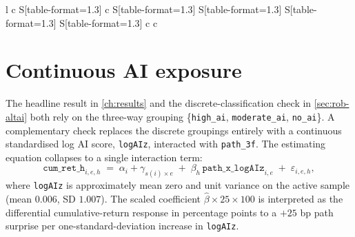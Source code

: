 \begin{table}[!htbp]
\begin{tabular}{l c S[table-format=1.3] c S[table-format=1.3] S[table-format=1.3] S[table-format=1.3] S[table-format=1.3] c c}
\bottomrule
\end{tabular}
\caption*{\footnotesize \textit{Notes.} Level critical values match those reported in the main-text GSADF tables (\cref{ch:results}) and are omitted for compactness; log critical values are recomputed under the log specification so that each verdict is evaluated against its own null. ``---'' indicates failure to reject at 90\,\%. Sample, lag order ($k=0$), control window ($T_b=50$), bootstrap seed, and bootstrap count ($n_{\mathrm{boot}} = \num{2000}$) are otherwise as in \cref{ch:results}.}
\end{table}




\section{Continuous AI exposure}
\label{app:rob-altai-continuous}

The headline result in \cref{ch:results} and the discrete-classification
check in \cref{sec:rob-altai} both rely on the three-way grouping
\{\texttt{high\_ai}, \texttt{moderate\_ai}, \texttt{no\_ai}\}.
A complementary check replaces the discrete groupings entirely with
a continuous standardised log AI score, \texttt{logAIz}, interacted
with \texttt{path\_3f}. The estimating equation collapses to a single
interaction term:
\begin{equation*}
    \mathtt{cum\_ret\_h}_{i,e,h}
    \;=\; \alpha_i + \gamma_{s(i)\times e}
    \;+\; \beta_h\,\mathtt{path\_x\_logAIz}_{i,e}
    \;+\; \varepsilon_{i,e,h},
\end{equation*}
where \texttt{logAIz} is approximately mean zero and unit variance on
the active sample (mean $0.006$, SD $1.007$). The scaled coefficient
$\hat\beta \times 25 \times 100$ is interpreted as the differential
cumulative-return response in percentage points to a $+25$ bp path
surprise per one-standard-deviation increase in \texttt{logAIz}.

